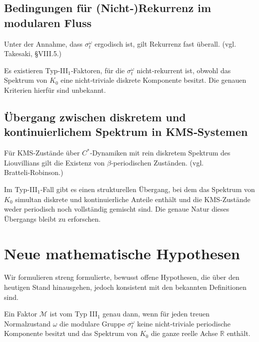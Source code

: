 \documentclass[12pt, a4paper]{article}
\begin{document}
\subsection{Bedingungen für (Nicht‑)Rekurrenz im modularen Fluss}
\begin{proposition}[Bekannt]
Unter der Annahme, dass $\sigma_t^{\omega}$ ergodisch ist, gilt Rekurrenz fast überall. (vgl. Takesaki, §VIII.5.)
\end{proposition}
\begin{conjecture}[Offen]
Es existieren Typ‑III$_1$‑Faktoren, für die $\sigma_t^{\omega}$ nicht‑rekurrent ist, obwohl das Spektrum von $K_0$ eine nicht‑triviale diskrete Komponente besitzt. Die genauen Kriterien hierfür sind unbekannt.
\end{conjecture}

\subsection{Übergang zwischen diskretem und kontinuierlichem Spektrum in KMS‑Systemen}
\begin{proposition}[Bekannt]
Für KMS‑Zustände über $C^*$‑Dynamiken mit rein diskretem Spektrum des Liouvillians gilt die Existenz von $\beta$‑periodischen Zuständen. (vgl. Bratteli‑Robinson.)
\end{proposition}
\begin{conjecture}[Offen]
Im Typ‑III$_1$‑Fall gibt es einen strukturellen Übergang, bei dem das Spektrum von $K_0$ simultan diskrete und kontinuierliche Anteile enthält und die KMS‑Zustände weder periodisch noch vollständig gemischt sind. Die genaue Natur dieses Übergangs bleibt zu erforschen.
\end{conjecture}

\section{Neue mathematische Hypothesen}
Wir formulieren streng formulierte, bewusst offene Hypothesen, die über den heutigen Stand hinausgehen, jedoch konsistent mit den bekannten Definitionen sind.

\begin{hypothesis}
Ein Faktor $\mathcal{M}$ ist vom Typ III$_1$ genau dann, wenn für jeden treuen Normalzustand $\omega$ die modulare Gruppe $\sigma_t^{\omega}$ keine nicht‑triviale periodische Komponente besitzt und das Spektrum von $K_0$ die ganze reelle Achse $\mathbb{R}$ enthält.
\end{hypothesis}
\end{document}
